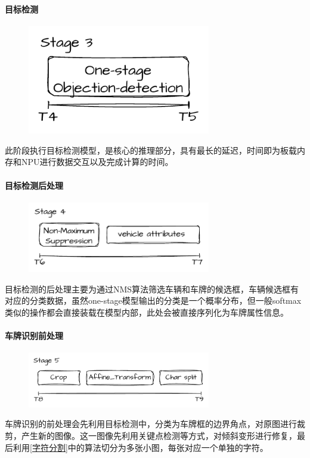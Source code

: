 \documentclass[master]{shtthesis}
\begin{document}
\paragraph{目标检测}
\begin{figure}[H]
	\centering
	\includegraphics[width=8cm]{img/s3.pdf}
	\label{目标检测阶段阶段}
\end{figure}
此阶段执行目标检测模型，是核心的推理部分，具有最长的延迟，时间即为板载内存和NPU进行数据交互以及完成计算的时间。

\paragraph{目标检测后处理}
\begin{figure}[H]
	\centering
	\includegraphics[width=8cm]{img/s4.pdf}
	\label{目标检测后处理阶段阶段}
\end{figure}
目标检测的后处理主要为通过NMS算法筛选车辆和车牌的候选框，车辆候选框有对应的分类数据，虽然one-stage模型输出的分类是一个概率分布，但一般softmax类似的操作都会直接装载在模型内部，此处会被直接序列化为车牌属性信息。

\paragraph{车牌识别前处理}
\begin{figure}[H]
	\centering
	\includegraphics[width=8cm]{img/s5.pdf}
	\label{车牌识别前处理阶段}
\end{figure}
车牌识别的前处理会先利用目标检测中，分类为车牌框的边界角点，对原图进行裁剪，产生新的图像。这一图像先利用关键点检测等方式，对倾斜变形进行修复，最后利用\ref{字符分割}中的算法切分为多张小图，每张对应一个单独的字符。
\end{document}
